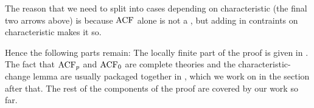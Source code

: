 The reason that we need to split into cases depending on characteristic
(the final two arrows above) is because $\operatorname{ACF}$ alone is not a
,
but adding in contraints on characteristic makes it so.

Hence the following parts remain:
The locally finite part of the proof is given in
.
The fact that $\operatorname{ACF}_{p}$ and $\operatorname{ACF}_{0}$ are {complete theories} and the
{characteristic-change lemma} are usually packaged together
in ,
which we work on in the section after that.
The rest of the components of the proof are covered by our work so far.
